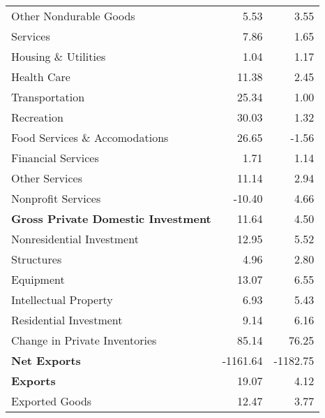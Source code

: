\documentclass[11pt, letterpaper]{article}\usepackage[]{graphicx}\usepackage[]{color}
\begin{document}
\begin{table}[H]
\begin{tabular}{lrr}
  \hspace{24mm}  Other Nondurable Goods & 5.53 & 3.55 \\ 
  \hspace{8mm}  Services & 7.86 & 1.65 \\ 
  \hspace{16mm}  Housing \& Utilities & 1.04 & 1.17 \\ 
  \hspace{16mm}  Health Care & 11.38 & 2.45 \\ 
  \hspace{16mm}  Transportation & 25.34 & 1.00 \\ 
  \hspace{16mm}  Recreation & 30.03 & 1.32 \\ 
  \hspace{16mm}  Food Services \& Accomodations & 26.65 & -1.56 \\ 
  \hspace{16mm}  Financial Services & 1.71 & 1.14 \\ 
  \hspace{16mm}  Other Services & 11.14 & 2.94 \\ 
  \hspace{16mm}  Nonprofit Services & -10.40 & 4.66 \\ 
  \hspace{0mm} \textbf{Gross Private Domestic Investment} & 11.64 & 4.50 \\ 
  \hspace{8mm}  Nonresidential Investment & 12.95 & 5.52 \\ 
  \hspace{16mm}  Structures & 4.96 & 2.80 \\ 
  \hspace{16mm}  Equipment & 13.07 & 6.55 \\ 
  \hspace{16mm}  Intellectual Property & 6.93 & 5.43 \\ 
  \hspace{8mm}  Residential Investment & 9.14 & 6.16 \\ 
  \hspace{8mm}  Change in Private Inventories & 85.14 & 76.25 \\ 
  \hspace{0mm} \textbf{Net Exports} & -1161.64 & -1182.75 \\ 
  \hspace{0mm} \textbf{Exports} & 19.07 & 4.12 \\ 
  \hspace{8mm}  Exported Goods & 12.47 & 3.77 \\ 

\end{tabular}
\end{table}
\end{document}
